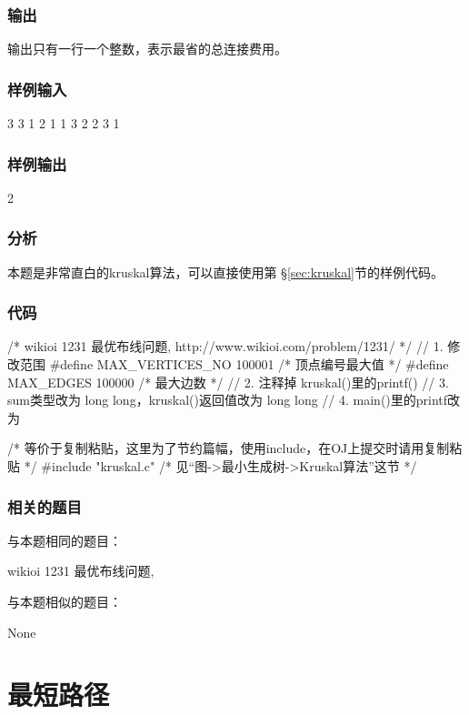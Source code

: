 \subsubsection{输出}
输出只有一行一个整数，表示最省的总连接费用。

\subsubsection{样例输入}
\begin{Code}
3 3
1 2 1
1 3 2
2 3 1
\end{Code}

\subsubsection{样例输出}
\begin{Code}
2
\end{Code}

\subsubsection{分析}
本题是非常直白的kruskal算法，可以直接使用第 \S \ref{sec:kruskal}节的样例代码。

\subsubsection{代码}
\begin{Codex}[label=wiring.c]
/* wikioi 1231 最优布线问题, http://www.wikioi.com/problem/1231/ */
// 1. 修改范围
#define MAX_VERTICES_NO 100001 /* 顶点编号最大值 */
#define MAX_EDGES 100000  /* 最大边数 */
// 2. 注释掉 kruskal()里的printf()
// 3. sum类型改为 long long，kruskal()返回值改为 long long
// 4. main()里的printf改为 %

/* 等价于复制粘贴，这里为了节约篇幅，使用include，在OJ上提交时请用复制粘贴 */
#include "kruskal.c"  /* 见“图->最小生成树->Kruskal算法”这节 */
\end{Codex}

\subsubsection{相关的题目}
与本题相同的题目：
\begindot
\item wikioi 1231 最优布线问题, 
\myenddot

与本题相似的题目：
\begindot
\item None
\myenddot


\section{最短路径} %

